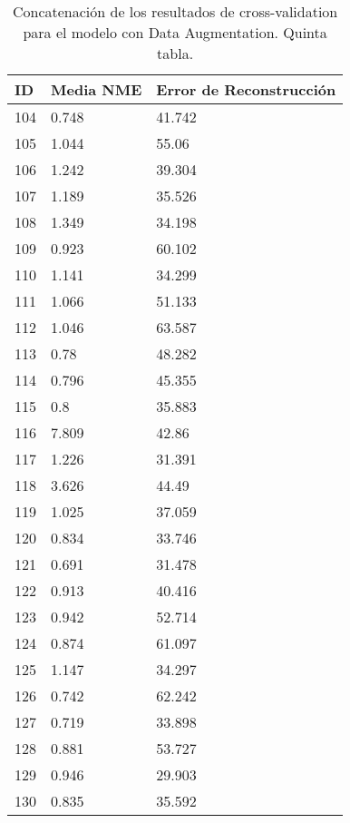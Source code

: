 \begin{table}[!ht]
    \centering
    \caption{Concatenación de los resultados de cross-validation para el modelo con Data Augmentation. Quinta tabla.}
    \begin{tabular}{|l|l|l|}
    \hline
    \cellcolor{gray!25}\textbf{ID} & \cellcolor{gray!25}\textbf{Media NME} & \cellcolor{gray!25}\textbf{Error de Reconstrucción} \\ \hline
        104 & 0.748 & 41.742 \\ \hline
        105 & 1.044 & 55.06 \\ \hline
        106 & 1.242 & 39.304 \\ \hline
        107 & 1.189 & 35.526 \\ \hline
        108 & 1.349 & 34.198 \\ \hline
        109 & 0.923 & 60.102 \\ \hline
        110 & 1.141 & 34.299 \\ \hline
        111 & 1.066 & 51.133 \\ \hline
        112 & 1.046 & 63.587 \\ \hline
        113 & 0.78 & 48.282 \\ \hline
        114 & 0.796 & 45.355 \\ \hline
        115 & 0.8 & 35.883 \\ \hline
        116 & 7.809 & 42.86 \\ \hline
        117 & 1.226 & 31.391 \\ \hline
        118 & 3.626 & 44.49 \\ \hline
        119 & 1.025 & 37.059 \\ \hline
        120 & 0.834 & 33.746 \\ \hline
        121 & 0.691 & 31.478 \\ \hline
        122 & 0.913 & 40.416 \\ \hline
        123 & 0.942 & 52.714 \\ \hline
        124 & 0.874 & 61.097 \\ \hline
        125 & 1.147 & 34.297 \\ \hline
        126 & 0.742 & 62.242 \\ \hline
        127 & 0.719 & 33.898 \\ \hline
        128 & 0.881 & 53.727 \\ \hline
        129 & 0.946 & 29.903 \\ \hline
        130 & 0.835 & 35.592 \\ \hline
    \end{tabular}
\end{table}

\endinput
